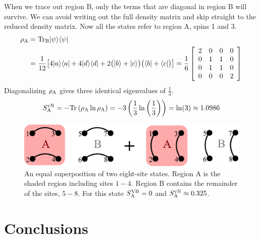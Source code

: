  When we trace out region B, only the terms that are diagonal in region B will survive. 
  We can avoid writing out the full density matrix and skip straight to the reduced density matrix.
  Now all the states refer to region A, spins 1 and 3.
  \begin{align}
\rho_{\rm A} &=  {\rm Tr_B} \lvert {\psi} \rangle\langle {\psi} \rvert \\ 
		&= \frac{1}{12} \big[ 
		4\lvert {a} \rangle \langle {a} \rvert + 4 \lvert {d} \rangle\langle {d} \rvert
		+ 2\big(\lvert {b} \rangle +\lvert {c} \rangle\big)\big(\langle {b} \rvert +\langle {c} \rvert\big)
		\big] =
		\frac{1}{6}
		\left[ \begin{array}{cccc}
		2 & 0&0&0\\
		0& 1& 1&0\\
		0& 1& 1&0\\
		0& 0& 0&2
		\end{array} \right]
 \end{align}
Diagonalizing $\rho_{\rm A}$ gives three identical eigenvalues of $\tfrac{1}{3}$.
\begin{align}
S^{\text{vN}}_{\rm A} = - {\rm Tr} \left(\rho_{\rm A} \ln \rho_{\rm A} \right)= -3\left( \frac{1}{3} \ln \left( \frac{1}{3}\right)\right)
		= \ln(3) \approx 1.0986
\end{align}




\begin{figure}
\centering 
\includegraphics[width=6in]{./figures/made/example2.pdf}
\caption[A superposition of two eight-site valence bond states]{An equal superposition of two eight-site states.
Region A is the shaded region including sites $1-4$.  
Region B contains the remainder of the sites, $5-8$.
For this state $S^{\text{VB}}_{\rm A}=0$ and $S^{\text{vN}}_{\rm A}\approx 0.325$.
\label{example2}
}
\end{figure}













\section{Conclusions}

